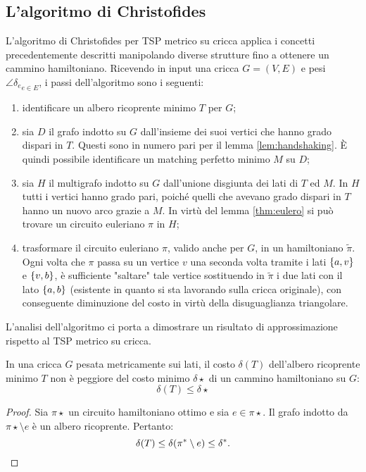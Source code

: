 \subsection{L'algoritmo di Christofides}
L'algoritmo di Christofides per TSP metrico su cricca applica i concetti precedentemente descritti manipolando diverse strutture fino a ottenere un cammino hamiltoniano. Ricevendo in input una cricca $G=(V,E)$ e pesi $\angle{\delta_e}_{e\in E}$, i passi dell'algoritmo sono i seguenti:
\begin{enumerate}
	\item identificare un albero ricoprente minimo $T$ per $G$;
	\item sia $D$ il grafo indotto su $G$ dall'insieme dei suoi vertici che hanno grado dispari in $T$.
	      Questi sono in numero pari per il lemma \ref{lem:handshaking}. È quindi possibile identificare un matching perfetto minimo $M$ su $D$;
	\item sia $H$ il multigrafo indotto su $G$ dall'unione disgiunta dei lati di $T$ ed $M$. In $H$ tutti i vertici hanno grado pari, poiché quelli che avevano grado dispari in $T$ hanno un nuovo arco grazie a $M$. In virtù del lemma \ref{thm:eulero} si può trovare un circuito euleriano $\pi$ in $H$;
	\item trasformare il circuito euleriano $\pi$, valido anche per $G$, in un hamiltoniano $\tilde\pi$.
	      Ogni volta che $\pi$ passa su un vertice $v$ una seconda volta tramite i lati $\set{a,v}$ e $\set{v,b}$, è sufficiente "saltare" tale vertice sostituendo in $\tilde\pi$ i due lati con il lato $\set{a,b}$ (esistente in quanto si sta lavorando sulla cricca originale), con conseguente diminuzione del costo in virtù della disuguaglianza triangolare.
\end{enumerate}

L'analisi dell'algoritmo ci porta a dimostrare un risultato di approssimazione rispetto al TSP metrico su cricca.
\begin{lemma}\label{lem:chri_spanning}
	In una cricca $G$ pesata metricamente sui lati, il costo $\delta(T)$ dell'albero ricoprente minimo $T$ non è peggiore del costo minimo $\delta\star$ di un cammino hamiltoniano su $G$:
	\begin{equation*}
		\delta(T) \leq \delta\star
	\end{equation*}
\end{lemma}
\begin{proof}
	Sia $\pi\star$ un circuito hamiltoniano ottimo e sia $e\in\pi\star$.
	Il grafo indotto da $\pi\star\setminus e$ è un albero ricoprente. Pertanto:
	\begin{equation*}
		\delta(T) \leq \delta(\pi\star\setminus e) \leq\delta\star \text.
	\end{equation*}
\end{proof}

